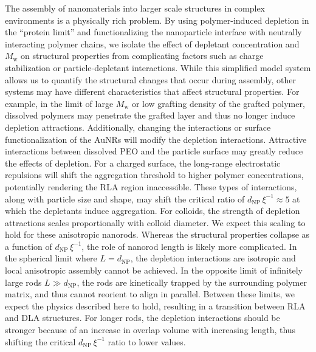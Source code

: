 \documentclass[journal=jacsat, superscriptaddress]{achemso}
\def\EDITS#1{{\color{black}#1}}
\def\EDITS#1{#1}
\def\EDITSJCC#1{{\color{black}#1}}
\def\EDITSJCC#1{#1}
\begin{document}
The assembly of nanomaterials into larger scale structures in complex environments is a physically rich problem. By using polymer-induced depletion in the ``protein limit'' and functionalizing the nanoparticle interface with neutrally interacting polymer chains, we isolate the effect of depletant concentration and $M_\mathrm{w}$ on structural properties from complicating factors such as charge stabilization or particle-depletant interactions. While this simplified model system allows us to quantify the structural changes that occur during assembly, other systems may have different characteristics that affect structural properties. For example, in the limit of large $M_\mathrm{w}$ or low grafting density of the grafted polymer, dissolved polymers may penetrate the grafted layer and thus no longer induce depletion attractions.\cite{Stiakakis2002} Additionally, changing the interactions or surface functionalization of the AuNRs will modify the depletion interactions. Attractive interactions between dissolved PEO and the particle surface may greatly reduce the effects of depletion.\cite{Carvalho1993,Zhang2012} For a charged surface, the long-range electrostatic repulsions will shift the aggregation threshold to higher polymer concentrations, potentially rendering the RLA region inaccessible. These types of interactions, along with particle size and shape, may shift the critical ratio of $d_\mathrm{NP} \, \xi^{-1} \approx 5$ at which the depletants induce aggregation. 
\EDITS{For colloids, the strength of depletion attractions scales proportionally with colloid diameter\EDITSJCC{.}\cite{Lekkerkerker2011} \EDITSJCC{We} expect \EDITSJCC{this scaling} to hold for these anisotropic nanorods. \EDITSJCC{Whereas} the structural properties collapse as a function of $d_\mathrm{NP} \, \xi^{-1}$, the role of nanorod length is likely more complicated. In the spherical limit where $L = d_\mathrm{NP}$, the depletion interactions \EDITSJCC{are} isotropic and local anisotropic assembly \EDITSJCC{cannot be achieved}. In the opposite limit of infinitely large rods $L \gg d_\mathrm{NP}$, the rods are kinetically trapped by the surrounding polymer matrix,\cite{Chatterjee2008,Fakhri2010} \EDITSJCC{and thus cannot reorient to align in parallel.} Between these limits, we expect the physics described here to hold, resulting in a transition between RLA and DLA structures. For longer rods, the depletion interactions should be stronger because of an increase in overlap volume with increasing length, thus shifting the critical $d_\mathrm{NP} \, \xi^{-1}$ ratio to lower values.}
\end{document}
